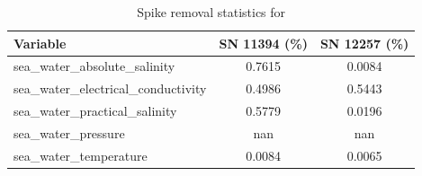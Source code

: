 \begin{table}[h]
\centering
\caption{Spike removal statistics for \projectname{} \casenumber{}}
\label{tab:str17_spike_stats}
\begin{tabular}{|l|c|c|}
\hline
Variable & SN 11394 (\%) & SN 12257 (\%) \\
\hline
sea\_water\_absolute\_salinity & 0.7615 & 0.0084 \\
sea\_water\_electrical\_conductivity & 0.4986 & 0.5443 \\
sea\_water\_practical\_salinity & 0.5779 & 0.0196 \\
sea\_water\_pressure & nan & nan \\
sea\_water\_temperature & 0.0084 & 0.0065 \\
\hline
\end{tabular}
\end{table}
